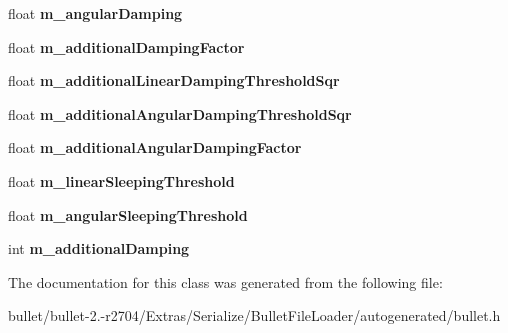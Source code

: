 \begin{DoxyCompactItemize}
\item 
\hypertarget{class_bullet_1_1bt_rigid_body_float_data_a7dc01bfb78751e807a5be8ae160ab491}{float {\bfseries m\+\_\+angular\+Damping}}\label{class_bullet_1_1bt_rigid_body_float_data_a7dc01bfb78751e807a5be8ae160ab491}

\item 
\hypertarget{class_bullet_1_1bt_rigid_body_float_data_ad68d568d819451ce06d4cf6f2481ee10}{float {\bfseries m\+\_\+additional\+Damping\+Factor}}\label{class_bullet_1_1bt_rigid_body_float_data_ad68d568d819451ce06d4cf6f2481ee10}

\item 
\hypertarget{class_bullet_1_1bt_rigid_body_float_data_a0b3867bc43513b5b4de9f7370552d838}{float {\bfseries m\+\_\+additional\+Linear\+Damping\+Threshold\+Sqr}}\label{class_bullet_1_1bt_rigid_body_float_data_a0b3867bc43513b5b4de9f7370552d838}

\item 
\hypertarget{class_bullet_1_1bt_rigid_body_float_data_a2dcd617c3fdb4c1c781c55eca4f4226e}{float {\bfseries m\+\_\+additional\+Angular\+Damping\+Threshold\+Sqr}}\label{class_bullet_1_1bt_rigid_body_float_data_a2dcd617c3fdb4c1c781c55eca4f4226e}

\item 
\hypertarget{class_bullet_1_1bt_rigid_body_float_data_ac9d4335ae6503ddb9f1f044dbf7f91ac}{float {\bfseries m\+\_\+additional\+Angular\+Damping\+Factor}}\label{class_bullet_1_1bt_rigid_body_float_data_ac9d4335ae6503ddb9f1f044dbf7f91ac}

\item 
\hypertarget{class_bullet_1_1bt_rigid_body_float_data_aec99c570c036a598b073379bc95a1aa8}{float {\bfseries m\+\_\+linear\+Sleeping\+Threshold}}\label{class_bullet_1_1bt_rigid_body_float_data_aec99c570c036a598b073379bc95a1aa8}

\item 
\hypertarget{class_bullet_1_1bt_rigid_body_float_data_a7e8b2f4d6318a819c62181fef6907807}{float {\bfseries m\+\_\+angular\+Sleeping\+Threshold}}\label{class_bullet_1_1bt_rigid_body_float_data_a7e8b2f4d6318a819c62181fef6907807}

\item 
\hypertarget{class_bullet_1_1bt_rigid_body_float_data_aef5810459fc50e4d2fcac6ea8947cec9}{int {\bfseries m\+\_\+additional\+Damping}}\label{class_bullet_1_1bt_rigid_body_float_data_aef5810459fc50e4d2fcac6ea8947cec9}

\end{DoxyCompactItemize}


The documentation for this class was generated from the following file\+:\begin{DoxyCompactItemize}
\item 
bullet/bullet-\/2.-\/r2704/\+Extras/\+Serialize/\+Bullet\+File\+Loader/autogenerated/bullet.\+h\end{DoxyCompactItemize}

